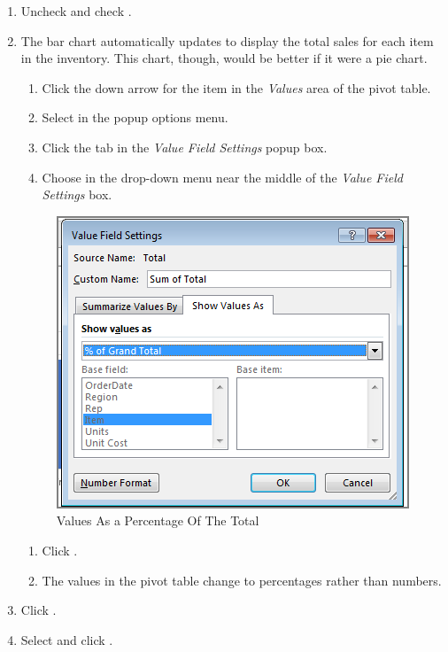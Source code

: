 \begin{enumerate}
	\item Uncheck  and check .
	\item The bar chart automatically updates to display the total sales for each item in the inventory. This chart, though, would be better if it were a pie chart.
	
	\begin{enumerate}
		\item Click the down arrow for the  item in the \textit{Values} area of the pivot table.
		\item Select  in the popup options menu.
		\item Click the  tab in the \textit{Value Field Settings} popup box.
		\item Choose  in the drop-down menu near the middle of the \textit{Value Field Settings} box.
\end{enumerate}

\begin{figure}[H]
	\centering
	\includegraphics[width=\maxwidth{.75\linewidth}]{gfx/ch07_fig29}
	\caption{Values As a Percentage Of The Total}
	\label{07:fig29}
\end{figure}

\begin{enumerate}[resume]		
		\item Click .
		\item The values in the pivot table change to percentages rather than numbers.
	\end{enumerate}
	
	\item Click .
	\item Select  and click .
\end{enumerate}

